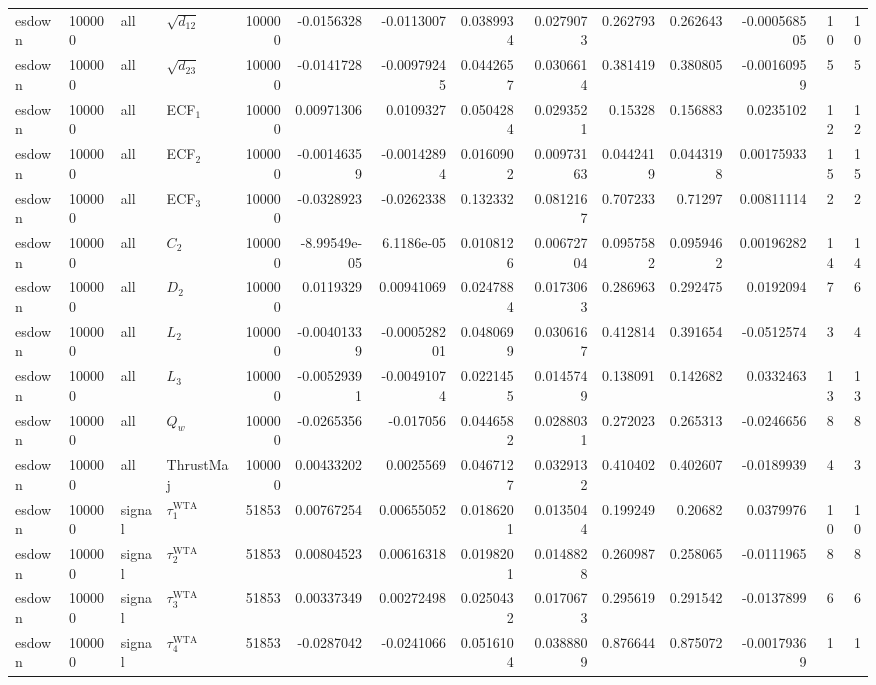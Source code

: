 \begin{landscape}
\begin{longtable}{llll r rrrr rr r rr}
esdown & 100000 & all & $\sqrt{d_{12}}$ & 100000 & -0.0156328 & -0.0113007 & 0.0389934 & 0.0279073 & 0.262793 & 0.262643 & -0.000568505 & 10 & 10 \\
esdown & 100000 & all & $\sqrt{d_{23}}$ & 100000 & -0.0141728 & -0.00979245 & 0.0442657 & 0.0306614 & 0.381419 & 0.380805 & -0.00160959 & 5 & 5 \\
esdown & 100000 & all & ECF$_1$ & 100000 & 0.00971306 & 0.0109327 & 0.0504284 & 0.0293521 & 0.15328 & 0.156883 & 0.0235102 & 12 & 12 \\
esdown & 100000 & all & ECF$_2$ & 100000 & -0.00146359 & -0.00142894 & 0.0160902 & 0.00973163 & 0.0442419 & 0.0443198 & 0.00175933 & 15 & 15 \\
esdown & 100000 & all & ECF$_3$ & 100000 & -0.0328923 & -0.0262338 & 0.132332 & 0.0812167 & 0.707233 & 0.71297 & 0.00811114 & 2 & 2 \\
esdown & 100000 & all & $C_2$ & 100000 & -8.99549e-05 & 6.1186e-05 & 0.0108126 & 0.00672704 & 0.0957582 & 0.0959462 & 0.00196282 & 14 & 14 \\
esdown & 100000 & all & $D_2$ & 100000 & 0.0119329 & 0.00941069 & 0.0247884 & 0.0173063 & 0.286963 & 0.292475 & 0.0192094 & 7 & 6 \\
esdown & 100000 & all & $L_2$ & 100000 & -0.00401339 & -0.000528201 & 0.0480699 & 0.0306167 & 0.412814 & 0.391654 & -0.0512574 & 3 & 4 \\
esdown & 100000 & all & $L_3$ & 100000 & -0.00529391 & -0.00491074 & 0.0221455 & 0.0145749 & 0.138091 & 0.142682 & 0.0332463 & 13 & 13 \\
esdown & 100000 & all & $Q_w$ & 100000 & -0.0265356 & -0.017056 & 0.0446582 & 0.0288031 & 0.272023 & 0.265313 & -0.0246656 & 8 & 8 \\
esdown & 100000 & all & ThrustMaj & 100000 & 0.00433202 & 0.0025569 & 0.0467127 & 0.0329132 & 0.410402 & 0.402607 & -0.0189939 & 4 & 3 \\
esdown & 100000 & signal & $\tau_1^{\mathrm{WTA}}$ & 51853 & 0.00767254 & 0.00655052 & 0.0186201 & 0.0135044 & 0.199249 & 0.20682 & 0.0379976 & 10 & 10 \\
esdown & 100000 & signal & $\tau_2^{\mathrm{WTA}}$ & 51853 & 0.00804523 & 0.00616318 & 0.0198201 & 0.0148828 & 0.260987 & 0.258065 & -0.0111965 & 8 & 8 \\
esdown & 100000 & signal & $\tau_3^{\mathrm{WTA}}$ & 51853 & 0.00337349 & 0.00272498 & 0.0250432 & 0.0170673 & 0.295619 & 0.291542 & -0.0137899 & 6 & 6 \\
esdown & 100000 & signal & $\tau_4^{\mathrm{WTA}}$ & 51853 & -0.0287042 & -0.0241066 & 0.0516104 & 0.0388809 & 0.876644 & 0.875072 & -0.00179369 & 1 & 1 \\

\end{longtable}
\end{landscape}
